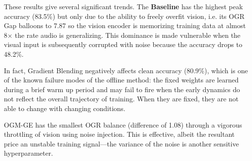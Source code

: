\documentclass{ieeeaccess}
\begin{document}
\begin{table}[h]
\caption{\textbf{Quantitative Benchmark Results (GPU).} Best Acc, OGR Gap (lower =
more balanced), Rob@0.5 and Rob@1.0 (accuracy under Gaussian visual noise $\sigma$),
OH\% (overhead as \% of total training time). All runs: 30 epochs, batch 64, SGD
lr=0.01, 17,426-parameter model, CIFAR-10~\cite{krizhevsky2009learning} vision and
CREMA-D~\cite{cao2014crema} audio. MFC-A reduces imbalance gap by \textbf{38.4\%}
at zero additional FLOPs.}
\label{tab:results}
\centering
{}
\end{table}

These results give several significant trends. The \textbf{Baseline} has the highest peak accuracy (83.5\%) but only due to the ability to freely overfit vision, i.e. its OGR Gap balloons to 7.87 so the vision encoder is memorizing training data at almost 8$\times$ the rate audio is generalizing. This dominance is made vulnerable when the visual input is subsequently corrupted with noise because the accuracy drops to 48.2\%.

In fact, Gradient Blending negatively affects clean accuracy (80.9\%), which is one of the known failure modes of the offline method: the fixed weights are learned during a brief warm up period and may fail to fire when the early dynamics do not reflect the overall trajectory of training. When they are fixed, they are not able to change with changing conditions.

OGM-GE has the smallest OGR balance (difference of 1.08) through a vigorous throttling of vision using noise injection. This is effective, albeit the resultant price an unstable training signal---the variance of the noise is another sensitive hyperparameter.
\end{document}
